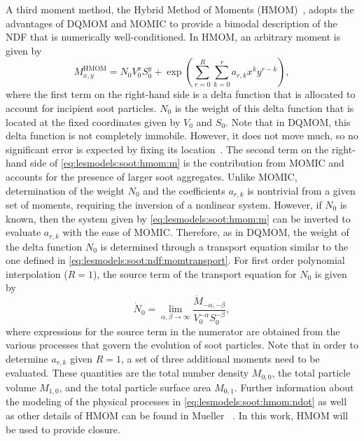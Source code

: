 


A third moment method, the Hybrid Method of Moments (HMOM)~\cite{hmom2009}, adopts the advantages of DQMOM and MOMIC to provide a bimodal description of the NDF that is numerically well-conditioned. In HMOM, an arbitrary moment is given by
\begin{equation}\label{eq:lesmodels:soot:hmom:m}
  M_{x,y}^{\text{HMOM}} = N_0 V_0^x S_0^y + \exp\left( \sum\limits_{r=0}^{R} \sum\limits_{k=0}^{r} a_{r,k}x^k y^{r-k} \right),
\end{equation}
where the first term on the right-hand side is a delta function that is allocated to account for incipient soot particles. $N_0$ is the weight of this delta function that is located at the fixed coordinates given by $V_0$ and $S_0$. Note that in DQMOM, this delta function is not completely immobile. However, it does not move much, so no significant error is expected by fixing its location~\cite{hmom2009}. The second term on the right-hand side of \cref{eq:lesmodels:soot:hmom:m} is the contribution from MOMIC and accounts for the presence of larger soot aggregates. Unlike MOMIC, determination of the weight $N_0$ and the coefficients $a_{r,k}$ is nontrivial from a given set of moments, requiring the inversion of a nonlinear system. However, if $N_0$ is known, then the system given by \cref{eq:lesmodels:soot:hmom:m} can be inverted to evaluate $a_{r,k}$ with the ease of MOMIC. Therefore, as in DQMOM, the weight of the delta function $N_0$ is determined through a transport equation similar to the one defined in \cref{eq:lesmodels:soot:ndf:momtransport}. For first order polynomial interpolation ($R = 1$), the source term of the transport equation for $N_0$ is given by
\begin{equation}\label{eq:lesmodels:soot:hmom:ndot}
  \dot{N}_0 = \lim_{\alpha,\beta\to\infty} \frac{\dot{M}_{-\alpha,-\beta}}{V_0^{-\alpha} S_0^{-\beta}},
\end{equation}
where expressions for the source term in the numerator are obtained from the various processes that govern the evolution of soot particles. Note that in order to determine $a_{r,k}$ given $R = 1$, a set of three additional moments need to be evaluated. These quantities are the total number density $M_{0,0}$, the total particle volume $M_{1,0}$, and the total particle surface area $M_{0,1}$. Further information about the modeling of the physical processes in \cref{eq:lesmodels:soot:hmom:ndot} as well as other details of HMOM can be found in Mueller \etal~\cite{hmom2009,mueller2009,mueller2011}. In this work, HMOM will be used to provide closure.
